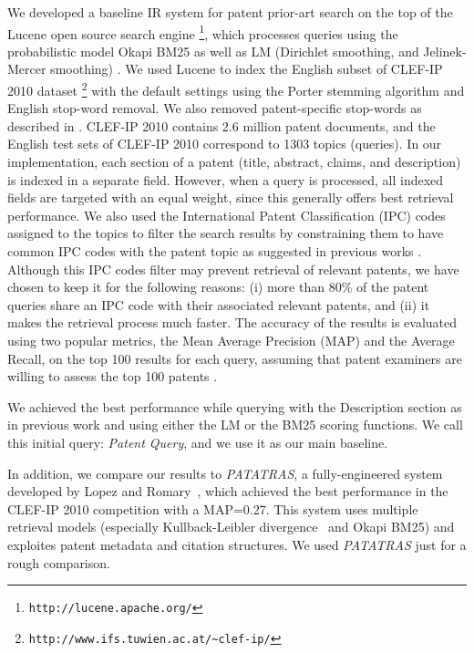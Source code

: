 We developed a baseline IR system for patent prior-art search on the top of
the Lucene open source search engine %
\footnote{\texttt{http://lucene.apache.org/}%
}, which processes queries using the probabilistic
model Okapi BM25 \cite{Robertson1993} as well as LM (Dirichlet
smoothing, and Jelinek-Mercer smoothing) \cite{Zhai2001}. %
We used Lucene to index the English subset of CLEF-IP 2010 dataset%
\footnote{\texttt{http://www.ifs.tuwien.ac.at/\textasciitilde{}clef-ip/}%
} with the default settings using the Porter stemming algorithm \cite{Porter1980} and English stop-word removal. 
We also removed patent-specific stop-words as described in \cite{magdy2012toward}.
CLEF-IP 2010 contains 2.6 million patent documents, and the English
test sets of CLEF-IP 2010 correspond to 1303 topics (queries). In
our implementation, each section of a patent (title, abstract, claims,
and description) is indexed in a separate field. However, when a query 
is processed, all indexed fields are targeted with an equal weight, since this generally
offers best retrieval performance. We also used the International
Patent Classification (IPC) codes assigned to the topics to filter
the search results by constraining them to have common IPC codes with
the patent topic as suggested in previous works \cite{lopez2010patatras}.
Although this IPC codes filter may prevent retrieval of relevant patents, we
have chosen to keep it for the following reasons: (i) more than 80\%
of the patent queries share an IPC code with their associated relevant
patents, and (ii) it makes the retrieval process much faster. The accuracy of the results is evaluated using two popular metrics, the Mean Average Precision (MAP) and the Average Recall, on the top 100 results for each query, assuming that patent examiners are willing to assess the top 100 patents \cite{joho2010survey}. 

We achieved the best performance while querying with the Description
section as in previous work \cite{xue2009transforming} and using
either the LM or the BM25 scoring functions. We call this initial
query: \textit{Patent Query}, and we use it as our main baseline.

In addition, we compare our results to \textit{PATATRAS}, a fully-engineered system developed by Lopez and Romary~\cite{lopez2010patatras}, which achieved the best performance in the CLEF-IP 2010 competition with a MAP=0.27. This system uses multiple retrieval models (especially Kullback-Leibler divergence~\cite{Baeza-Yates2011} and Okapi BM25) and exploites patent metadata and citation structures. We used \textit{PATATRAS} just for a rough comparison.
% 